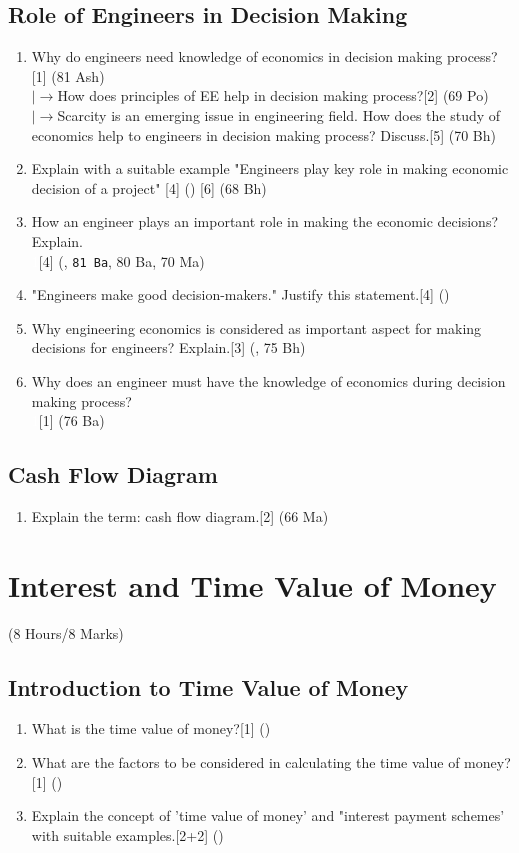\documentclass[12pt]{article}
\newcommand{\lb}{\\ $\left|\rightarrow\right.$}
\newcommand{\enter}{\\\textcolor{white}{1}}
\begin{document}
	\subsection{Role of Engineers in Decision Making}
	\begin{enumerate}[noitemsep, topsep=0pt]
	\item Why do engineers need knowledge of economics in decision making process?\hfill[1] (81 Ash)
	\lb How does principles of EE help in decision making process?\hfill[2] (69 Po)
	\lb Scarcity is an emerging issue in engineering field. How does the study of economics help to engineers in decision making process? Discuss.\hfill[5] (70 Bh)

	\item Explain with a suitable example "Engineers play key role in making economic decision of a project" \hfill[4] () [6] (68 Bh)

	\item How an engineer plays an important role in making the economic decisions? Explain.
	\enter\hfill[4] (, \texttt{81 Ba}, 80 Ba, 70 Ma)
	\item "Engineers make good decision-makers." Justify this statement.\hfill[4] ()
	\item Why engineering economics is considered as important aspect for making decisions for engineers? Explain.\hfill[3] (, 75 Bh)
	\item Why does an engineer must have the knowledge of economics during decision making process?
	\enter\hfill[1] (76 Ba)
	\end{enumerate}
	\subsection{Cash Flow Diagram}
	\begin{enumerate}
	\item Explain the term: cash flow diagram.\hfill[2] (66 Ma)
	\end{enumerate}

	\pagebreak
\section{Interest and Time Value of Money}
	\begin{center}(8 Hours/8 Marks)\end{center}
	\subsection{Introduction to Time Value of Money}
	\begin{enumerate}
	\item What is the time value of money?\hfill[1] ()

	\item What are the factors to be considered in calculating the time value of money?\hfill[1] ()

	\item Explain the concept of 'time value of money' and "interest payment schemes' with suitable examples.\hspace{14.4cm}[2+2] ()
	\end{enumerate}
\end{document}
